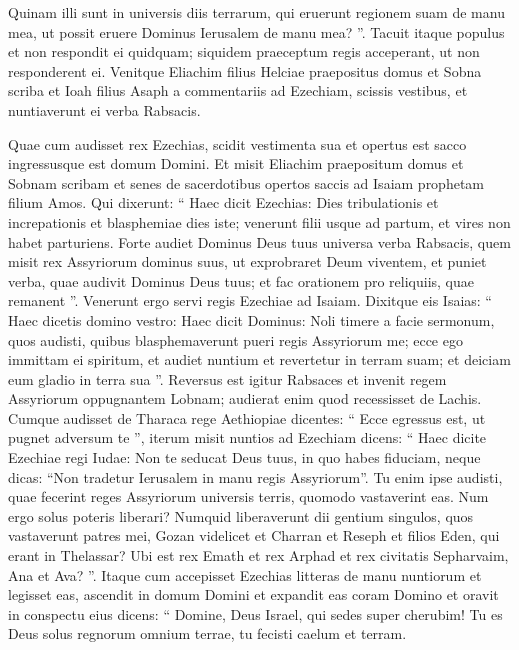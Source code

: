 \begin{biblechapter}
\begin{biblechapter}
\begin{biblechapter}
\begin{biblechapter}
\begin{biblechapter}
\begin{biblechapter}
\begin{biblechapter}
\begin{biblechapter}
\begin{biblechapter}
\begin{biblechapter}
\begin{biblechapter}
\begin{biblechapter}
\begin{biblechapter}
\begin{biblechapter}
\begin{biblechapter}
\begin{biblechapter}
\begin{biblechapter}
\begin{biblechapter}
\verse Quinam illi sunt in universis diis terrarum, qui eruerunt regionem suam de manu mea, ut possit eruere Dominus Ierusalem de manu mea? ”.
 \verse Tacuit itaque populus et non respondit ei quidquam; siquidem praeceptum regis acceperant, ut non responderent ei. 
\verse Venitque Eliachim filius Helciae praepositus domus et Sobna scriba et Ioah filius Asaph a commentariis ad Ezechiam, scissis vestibus, et nuntiaverunt ei verba Rabsacis.
 
\begin{biblechapter}
 \verse Quae cum audisset rex Ezechias, scidit vestimenta sua et opertus est sacco ingressusque est domum Domini. 
\verse Et misit Eliachim praepositum domus et Sobnam scribam et senes de sacerdotibus opertos saccis ad Isaiam prophetam filium Amos. 
\verse Qui dixerunt: “ Haec dicit Ezechias: Dies tribulationis et increpationis et blasphemiae dies iste; venerunt filii usque ad partum, et vires non habet parturiens. 
\verse Forte audiet Dominus Deus tuus universa verba Rabsacis, quem misit rex Assyriorum dominus suus, ut exprobraret Deum viventem, et puniet verba, quae audivit Dominus Deus tuus; et fac orationem pro reliquiis, quae remanent ”.
 \verse Venerunt ergo servi regis Ezechiae ad Isaiam. 
\verse Dixitque eis Isaias: “ Haec dicetis domino vestro: Haec dicit Dominus: Noli timere a facie sermonum, quos audisti, quibus blasphemaverunt pueri regis Assyriorum me; 
\verse ecce ego immittam ei spiritum, et audiet nuntium et revertetur in terram suam; et deiciam eum gladio in terra sua ”.
 \verse Reversus est igitur Rabsaces et invenit regem Assyriorum oppugnantem Lobnam; audierat enim quod recessisset de Lachis. 
\verse Cumque audisset de Tharaca rege Aethiopiae dicentes: “ Ecce egressus est, ut pugnet adversum te ”, iterum misit nuntios ad Ezechiam dicens: 
\verse “ Haec dicite Ezechiae regi Iudae: Non te seducat Deus tuus, in quo habes fiduciam, neque dicas: “Non tradetur Ierusalem in manu regis Assyriorum”. 
\verse Tu enim ipse audisti, quae fecerint reges Assyriorum universis terris, quomodo vastaverint eas. Num ergo solus poteris liberari? 
\verse Numquid liberaverunt dii gentium singulos, quos vastaverunt patres mei, Gozan videlicet et Charran et Reseph et filios Eden, qui erant in Thelassar? 
\verse Ubi est rex Emath et rex Arphad et rex civitatis Sepharvaim, Ana et Ava? ”.
 \verse Itaque cum accepisset Ezechias litteras de manu nuntiorum et legisset eas, ascendit in domum Domini et expandit eas coram Domino 
\verse et oravit in conspectu eius dicens: “ Domine, Deus Israel, qui sedes super cherubim! Tu es Deus solus regnorum omnium terrae, tu fecisti caelum et terram. 

\end{biblechapter}
\end{biblechapter}
\end{biblechapter}
\end{biblechapter}
\end{biblechapter}
\end{biblechapter}
\end{biblechapter}
\end{biblechapter}
\end{biblechapter}
\end{biblechapter}
\end{biblechapter}
\end{biblechapter}
\end{biblechapter}
\end{biblechapter}
\end{biblechapter}
\end{biblechapter}
\end{biblechapter}
\end{biblechapter}
\end{biblechapter}
